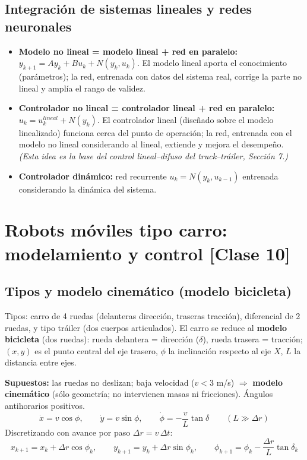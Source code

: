 \documentclass[11pt,a4paper]{article}
\begin{document}
\subsection{Integración de sistemas lineales y redes neuronales}

\begin{itemize}[itemsep=1pt]
\item \textbf{Modelo no lineal = modelo lineal + red en paralelo:} $y_{k+1}=A y_k+B u_k+N(y_k,u_k)$. El modelo lineal aporta el conocimiento (parámetros); la red, entrenada con datos del sistema real, corrige la parte no lineal y amplía el rango de validez.
\item \textbf{Controlador no lineal = controlador lineal + red en paralelo:} $u_k = u_k^{lineal} + N(y_k)$. El controlador lineal (diseñado sobre el modelo linealizado) funciona cerca del punto de operación; la red, entrenada con el modelo no lineal considerando al lineal, extiende y mejora el desempeño. \emph{(Esta idea es la base del control lineal--difuso del truck--tráiler, Sección 7.)}
\item \textbf{Controlador dinámico:} red recurrente $u_{k}=N(y_k,u_{k-1})$ entrenada considerando la dinámica del sistema.
\end{itemize}

\section{Robots móviles tipo carro: modelamiento y control \hfill {\normalsize [Clase 10]}}

\subsection{Tipos y modelo cinemático (modelo bicicleta)}

Tipos: carro de 4 ruedas (delanteras dirección, traseras tracción), diferencial de 2 ruedas, y tipo tráiler (dos cuerpos articulados). El carro se reduce al \textbf{modelo bicicleta} (dos ruedas): rueda delantera = dirección ($\delta$), rueda trasera = tracción; $(x,y)$ es el punto central del eje trasero, $\phi$ la inclinación respecto al eje $X$, $L$ la distancia entre ejes.

\textbf{Supuestos:} las ruedas no deslizan; baja velocidad ($v<3$ m/s) $\Rightarrow$ \textbf{modelo cinemático} (sólo geometría; no intervienen masas ni fricciones). Ángulos antihorarios positivos.
\[
\dot x=v\cos\phi,\qquad
\dot y=v\sin\phi,\qquad
\dot\phi=-\frac{v}{L}\tan\delta
\qquad (L\gg\Delta r)
\]
Discretizando con avance por paso $\Delta r=v\,\Delta t$:
\[
x_{k+1}=x_k+\Delta r\cos\phi_k,\qquad
y_{k+1}=y_k+\Delta r\sin\phi_k,\qquad
\phi_{k+1}=\phi_k-\frac{\Delta r}{L}\tan\delta_k
\]
\end{document}
